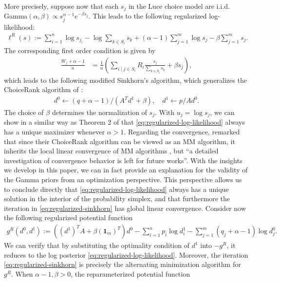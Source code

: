 More precisely, suppose now that each $s_j$ in the Luce choice model are i.i.d. Gamma$(\alpha,\beta)\propto s_j^{\alpha-1}e^{-\beta s_j}$. This leads to the following regularized log-likelihood:
\begin{align}
\label{eq:regularized-log-likelihood}
\ell^R(s):=\sum_{i=1}^{n}\log s_{j_i}-\log\sum_{k\in S_{i}}s_{k} +(\alpha-1)\sum_{j=1}^{m}\log s_j - \beta \sum_{j=1}^{m} s_j.
\end{align}
The corresponding first order condition is given by
\begin{align}
\label{eq:optimality-regularized}
\frac{W_j+\alpha-1}{n} & = \frac{1}{n} \left(\sum_{i\mid j\in S_{i}}R_i \frac{s_{j}}{\sum_{k\in S_{i}}s_{k}} +\beta s_j\right),
\end{align}
which leads to the following modified Sinkhorn's algorithm, which generalizes the ChoiceRank algorithm of \citet{maystre2017choicerank}: 
\begin{align}
\label{eq:regularized-sinkhorn}
 d^0 \leftarrow (q+\alpha -1)/ (A^Td^1+\beta),  \quad d^1 \leftarrow p/A d^0.
\end{align}
 The choice of $\beta$ determines the normalization of $s_j$. With $u_j=\log s_j$, we can show in a similar way as Theorem 2 of \citet{maystre2017choicerank} that \eqref{eq:regularized-log-likelihood} always has a unique maximizer whenever $\alpha>1$. Regarding the convergence, \citet{maystre2017choicerank} remarked that since their ChoiceRank algorithm can be viewed as an MM algorithm, it inherits the local linear convergence of MM algorithms \citep{lange2000optimization}, but ``a detailed investigation of convergence behavior is left for future works''. With the insights we develop in this paper, we can in fact provide an explanation for the validity of the Gamma priors from an optimization perspective. This perspective allows us to conclude directly that \eqref{eq:regularized-log-likelihood} always has a unique solution in the interior of the probability simplex, and that furthermore the iteration in \eqref{eq:regularized-sinkhorn} has global linear convergence. 
 Consider now the following regularized potential function
 \begin{align}
     g^R(d^0,d^1)	:= ((d^1)^{T}A+\beta (\mathbf{1}_m)^T)d^0-\sum_{i=1}^{n}p_{i}\log d^1_{i}-\sum_{j=1}^{m}(q_{j}+\alpha-1)\log d^0_{j}.
\end{align}
We can verify that by substituting the optimality condition of $d^1$ into $-g^R$, it reduces to the log posterior \eqref{eq:regularized-log-likelihood}. Moreover, the iteration \eqref{eq:regularized-sinkhorn} is precisely the alternating minimization algorithm for $g^R$. When $\alpha-1,\beta>0$, the reparameterized potential function
